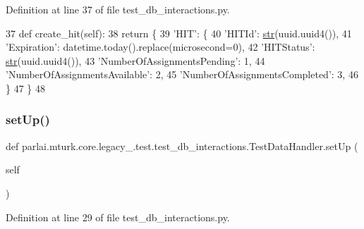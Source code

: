 Definition at line 37 of file test\+\_\+db\+\_\+interactions.\+py.


\begin{DoxyCode}
37     \textcolor{keyword}{def }create\_hit(self):
38         \textcolor{keywordflow}{return} \{
39             \textcolor{stringliteral}{'HIT'}: \{
40                 \textcolor{stringliteral}{'HITId'}: \hyperlink{namespacegenerate__task__READMEs_a5b88452ffb87b78c8c85ececebafc09f}{str}(uuid.uuid4()),
41                 \textcolor{stringliteral}{'Expiration'}: datetime.today().replace(microsecond=0),
42                 \textcolor{stringliteral}{'HITStatus'}: \hyperlink{namespacegenerate__task__READMEs_a5b88452ffb87b78c8c85ececebafc09f}{str}(uuid.uuid4()),
43                 \textcolor{stringliteral}{'NumberOfAssignmentsPending'}: 1,
44                 \textcolor{stringliteral}{'NumberOfAssignmentsAvailable'}: 2,
45                 \textcolor{stringliteral}{'NumberOfAssignmentsCompleted'}: 3,
46             \}
47         \}
48 
\end{DoxyCode}
\mbox{\label{classparlai_1_1mturk_1_1core_1_1legacy__2018_1_1test_1_1test__db__interactions_1_1TestDataHandler_ae4a243a3b7e3c5422f0ce0c4dc46c78e}} 
\subsubsection{\texorpdfstring{set\+Up()}{setUp()}}
{\footnotesize\ttfamily def parlai.\+mturk.\+core.\+legacy\+\_.\+test.\+test\+\_\+db\+\_\+interactions.\+Test\+Data\+Handler.\+set\+Up (\begin{DoxyParamCaption}\item[{}]{self }\end{DoxyParamCaption})}



Definition at line 29 of file test\+\_\+db\+\_\+interactions.\+py.


